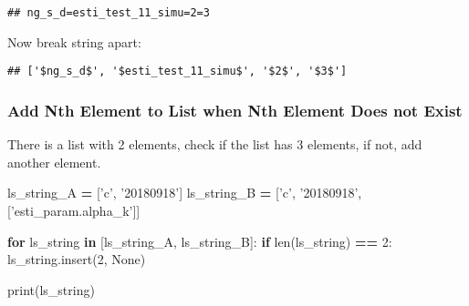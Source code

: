 \documentclass[
]{book}
\newenvironment{Shaded}{\begin{snugshade}}{\end{snugshade}}
\newcommand{\BuiltInTok}[1]{#1}
\newcommand{\ControlFlowTok}[1]{\textcolor[rgb]{0.13,0.29,0.53}{\textbf{#1}}}
\newcommand{\DecValTok}[1]{\textcolor[rgb]{0.00,0.00,0.81}{#1}}
\newcommand{\KeywordTok}[1]{\textcolor[rgb]{0.13,0.29,0.53}{\textbf{#1}}}
\newcommand{\NormalTok}[1]{#1}
\newcommand{\OperatorTok}[1]{\textcolor[rgb]{0.81,0.36,0.00}{\textbf{#1}}}
\newcommand{\StringTok}[1]{\textcolor[rgb]{0.31,0.60,0.02}{#1}}
\newcommand{\VariableTok}[1]{\textcolor[rgb]{0.00,0.00,0.00}{#1}}
\begin{document}
\begin{verbatim}
## ng_s_d=esti_test_11_simu=2=3
\end{verbatim}

Now break string apart:

\begin{Shaded}
\end{Shaded}

\begin{verbatim}
## ['$ng_s_d$', '$esti_test_11_simu$', '$2$', '$3$']
\end{verbatim}

\hypertarget{add-nth-element-to-list-when-nth-element-does-not-exist}{%
\subsubsection{Add Nth Element to List when Nth Element Does not Exist}\label{add-nth-element-to-list-when-nth-element-does-not-exist}}

There is a list with 2 elements, check if the list has 3 elements, if not, add another element.

\begin{Shaded}
\begin{Highlighting}[]
\NormalTok{ls_string_A }\OperatorTok{=}\NormalTok{ [}\StringTok{'c'}\NormalTok{, }\StringTok{'20180918'}\NormalTok{]}
\NormalTok{ls_string_B }\OperatorTok{=}\NormalTok{ [}\StringTok{'c'}\NormalTok{, }\StringTok{'20180918'}\NormalTok{, [}\StringTok{'esti_param.alpha_k'}\NormalTok{]]}

\ControlFlowTok{for}\NormalTok{ ls_string }\KeywordTok{in}\NormalTok{ [ls_string_A, ls_string_B]:}
  \ControlFlowTok{if} \BuiltInTok{len}\NormalTok{(ls_string) }\OperatorTok{==} \DecValTok{2}\NormalTok{:}
\NormalTok{    ls_string.insert(}\DecValTok{2}\NormalTok{, }\VariableTok{None}\NormalTok{)}
    
  \BuiltInTok{print}\NormalTok{(ls_string)}
  
\end{Highlighting}
\end{Shaded}
\end{document}
